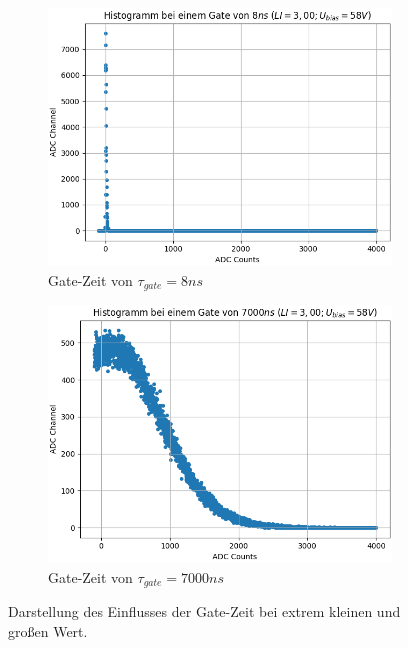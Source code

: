 \documentclass[12pt]{article}
\begin{document}
\begin{figure}[h!]
  \centering
  \begin{subfigure}{0.49\textwidth}
    \includegraphics[width=\textwidth]{Grafiken/gate_8}
    \caption{Gate-Zeit von $\tau_{gate} = 8 ns$}
  \end{subfigure}
  \begin{subfigure}{0.49\textwidth}
    \includegraphics[width=\textwidth]{Grafiken/gate_7000}
    \caption{Gate-Zeit von $\tau_{gate} = 7000 ns$}
  \end{subfigure}
  \caption{Darstellung des Einflusses der Gate-Zeit bei extrem kleinen und großen Wert.}
  \label{GateSpeilen}
\end{figure}
\end{document}
